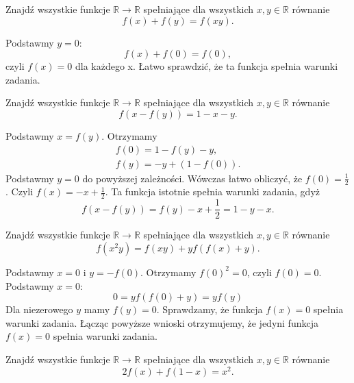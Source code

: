 \newpage
{}

\begin{problem}{1} 
	Znajdź wszystkie funkcje $\mathbb{R} \rightarrow \mathbb{R} $ spełniające dla wszystkich $x, y \in \mathbb{R} $ równanie
	\[
		 f(x)+f(y) = f(xy).
	\]
\end{problem}


\noindent
Podstawmy $y=0$: \[ f(x) + f(0) = f(0), \] czyli $f(x) = 0 $ dla każdego x. Łatwo sprawdzić, że ta funkcja spełnia warunki zadania. 

\vspace{10px}

\begin{problem}{2}
	Znajdź wszystkie funkcje $\mathbb{R} \rightarrow \mathbb{R} $ spełniające dla wszystkich $x, y \in \mathbb{R} $ równanie
	\[
		 f(x-f(y)) = 1 - x - y.
	\]
\end{problem}

\noindent
Podstawmy $x = f(y)$. Otrzymamy 
\begin{gather*}
	f(0) = 1 - f(y) - y, \\
	f(y) = - y + (1 - f(0)).
\end{gather*} 
Podstawmy $y = 0$ do powyższej zależności. Wówczas łatwo obliczyć, że $f(0)=\frac{1}{2}$. Czyli $f(x) = - x + \frac{1}{2} $. Ta funkcja istotnie spełnia warunki zadania, gdyż
\[
	f(x - f(y)) = f(y) - x + \frac{1}{2} = 1 - y - x .
\]

\begin{problem}{3}
	Znajdź wszystkie funkcje $\mathbb{R} \rightarrow \mathbb{R} $ spełniające dla wszystkich $x, y \in \mathbb{R} $ równanie 
	\[
		f(x^{2}y) = f(xy) + yf(f(x) + y).
	\]
\end{problem}


\noindent
Podstawmy $x = 0$ i $y = -f(0)$. Otrzymamy $f(0)^{2}=0$, czyli $f(0)=0$. Podstawmy $x=0$: 
\[ 
	0 = yf(f(0) + y) = yf(y)
\] 
Dla niezerowego $y$ mamy $f(y) = 0$.
Sprawdzamy, że funkcja $f(x) = 0$ spełnia warunki zadania. Łącząc powyższe wnioski otrzymujemy, że jedyni funkcja $f(x)=0$ spełnia warunki zadania. 

\newpage

\begin{problem}{4}
	Znajdź wszystkie funkcje $\mathbb{R} \rightarrow \mathbb{R} $ spełniające dla wszystkich $x, y \in \mathbb{R} $ równanie 
	\[
		2f(x) + f(1 - x) = x^{2}.
	\] 
\end{problem}

